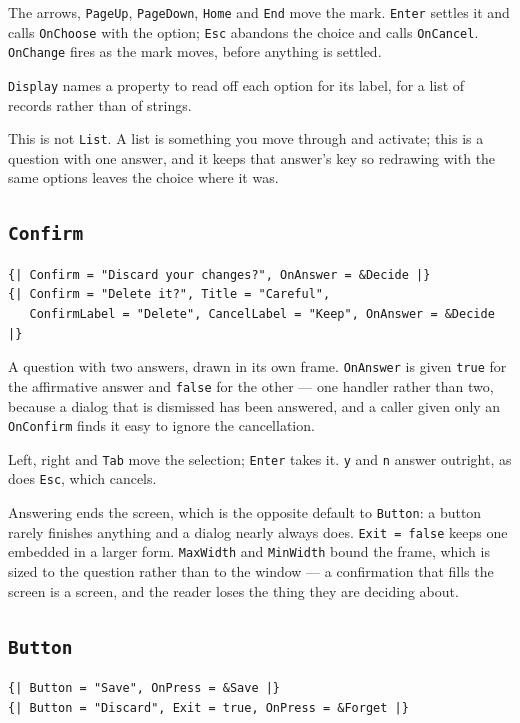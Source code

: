 \documentclass[11pt,a4paper,twoside,openany]{book}
\newcommand{\code}[1]{\texttt{\small #1}}
\begin{document}
The arrows, \code{PageUp}, \code{PageDown}, \code{Home} and \code{End} move the
mark. \code{Enter} settles it and calls \code{OnChoose} with the option;
\code{Esc} abandons the choice and calls \code{OnCancel}. \code{OnChange} fires as
the mark moves, before anything is settled.

\code{Display} names a property to read off each option for its label, for a list
of records rather than of strings.

This is not \code{List}. A list is something you move through and activate; this is
a question with one answer, and it keeps that answer's key so redrawing with the
same options leaves the choice where it was.

\subsection{\texttt{Confirm}}

\begin{lstlisting}
{| Confirm = "Discard your changes?", OnAnswer = &Decide |}
{| Confirm = "Delete it?", Title = "Careful",
   ConfirmLabel = "Delete", CancelLabel = "Keep", OnAnswer = &Decide |}
\end{lstlisting}

A question with two answers, drawn in its own frame. \code{OnAnswer} is given
\code{true} for the affirmative answer and \code{false} for the other --- one handler
rather than two, because a dialog that is dismissed has been answered, and a caller
given only an \code{OnConfirm} finds it easy to ignore the cancellation.

Left, right and \code{Tab} move the selection; \code{Enter} takes it. \code{y} and
\code{n} answer outright, as does \code{Esc}, which cancels.

Answering ends the screen, which is the opposite default to \code{Button}: a button
rarely finishes anything and a dialog nearly always does. \code{Exit = false} keeps
one embedded in a larger form. \code{MaxWidth} and \code{MinWidth} bound the frame,
which is sized to the question rather than to the window --- a confirmation that
fills the screen is a screen, and the reader loses the thing they are deciding about.

\subsection{\texttt{Button}}

\begin{lstlisting}
{| Button = "Save", OnPress = &Save |}
{| Button = "Discard", Exit = true, OnPress = &Forget |}
\end{lstlisting}
\end{document}
